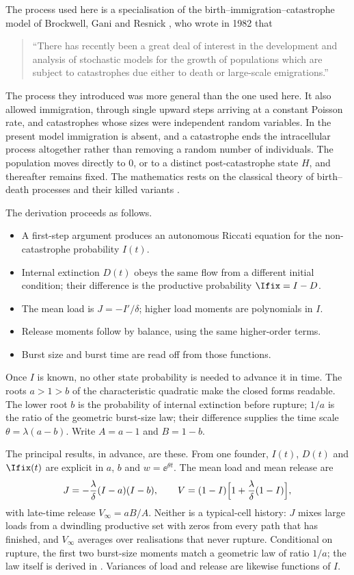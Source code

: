 The process used here is a specialisation of the birth--immigration--catastrophe
model of Brockwell, Gani and Resnick \cite{brockwell1982birth}, who wrote in 1982
that
\begin{quotation}
\textquotedblleft There has recently been a great deal of interest in the
development and analysis of stochastic models for the growth of populations
which are subject to catastrophes due either to death or large-scale
emigrations.\textquotedblright
\end{quotation}
The process they introduced was more general than the one used here. It also
allowed immigration, through single upward steps arriving at a constant Poisson
rate, and catastrophes whose sizes were independent random variables. In the
present model immigration is absent, and a catastrophe ends the intracellular
process altogether rather than removing a random number of individuals. The
population moves directly to $0$, or to a distinct post-catastrophe state $H$,
and thereafter remains fixed. The mathematics rests on the classical theory of
birth--death processes and their killed variants
\cite{karlin1957classification,karlin1982linear,di2008note}.

The derivation proceeds as follows.
\begin{itemize}[leftmargin=1.8em,itemsep=0.2em,topsep=0.3em]
\item A first-step argument produces an autonomous Riccati equation for the
non-catastrophe probability $I(t)$.
\item Internal extinction $D(t)$ obeys the same flow from a different initial
condition; their difference is the productive probability $\Ifix=I-D$.
\item The mean load is $J=-I'/\delta$; higher load moments are polynomials in
$I$.
\item Release moments follow by balance, using the same higher-order terms.
\item Burst size and burst time are read off from those functions.
\end{itemize}
Once $I$ is known, no other state probability is needed to advance it in time.
The roots $a>1>b$ of the
characteristic quadratic make the closed forms readable. The lower root $b$ is
the probability of internal extinction before rupture; $1/a$ is the ratio of
the geometric burst-size law; their difference supplies the time scale
$\theta=\lambda(a-b)$. Write $A=a-1$ and $B=1-b$.

The principal results, in advance, are these. From one founder, $I(t)$,
$D(t)$ and $\Ifix(t)$ are explicit in $a$, $b$ and $w=\ee^{\theta t}$. The
mean load and mean release are
\[
J=-\frac{\lambda}{\delta}(I-a)(I-b),
\qquad
V=(1-I)\Bigl[1+\frac{\lambda}{\delta}(1-I)\Bigr],
\]
with late-time release $V_\infty=aB/A$. Neither is a typical-cell history:
$J$ mixes large loads from a dwindling productive set with zeros from every
path that has finished, and $V_\infty$ averages over realisations that never
rupture. Conditional on rupture, the first two burst-size moments match a
geometric law of ratio $1/a$; the law itself is derived in
. Variances of load and release are likewise
functions of $I$.

